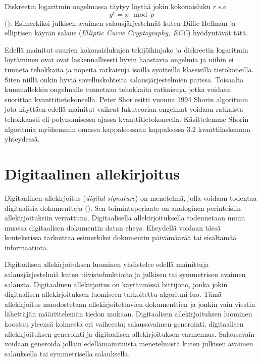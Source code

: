  Diskreetin logaritmin ongelmassa täytyy löytää jokin kokonaisluku 
 $r$ s.e 
 \[g^{r} = x \mod p\]
 (\cite{mavroeidis2018impact}). Esimerkiksi julkisen avaimen salausjärjestelmät kuten Diffie-Hellman ja elliptisen käyrän salaus (\emph{Elliptic Curve Cryptography, ECC}) hyödyntävät tätä.
 
 Edellä mainitut suurien kokonaislukujen tekijöihinjako ja diskreetin logaritmin löytäminen ovat ovat laskennallisesti hyvin haastavia ongelmia ja niihin ei tunneta tehokkaita ja nopeita ratkaisuja isoilla syötteillä klassisilla tietokoneilla. Siten niillä onkin hyviä sovelluskohteita salausjärjestelmien parissa. Toisaalta kummallekkin ongelmalle tunnetaan tehokkaita ratkaisuja, jotka voidaan suorittaa kvanttitietokoneella. Peter Shor esitti vuonna 1994 Shorin algoritmin jota käyttäen edellä mainitut vaikeat lukuteorian ongelmat voidaan ratkaista tehokkaasti eli polynomisessa ajassa kvanttitietokoneella. Käsittelemme Shorin algoritmia myöhemmin omassa kappaleessaan kappaleessa 3.2 kvanttilaskennan yhteydessä.
 
 \section{Digitaalinen allekirjoitus}
 Digitaalinen allekirjoitus (\emph{digital signature}) on menetelmä, jolla voidaan todentaa digitaalisia dokumentteja (\cite{1649003}). Sen toimintaperiaate on analoginen perinteisiin allekirjoituksiin verrattuna. Digitaalisella allekirjoituksella todennetaan muun muassa digitaalisen dokumentin datan eheys. Eheydellä voidaan tässä kontekstissa tarkoittaa esimerkiksi dokumentin päivämäärää tai sisältämää informaatiota.
 
 Digitaalisen allekirjoituksen luominen yhdistelee edellä mainittuja salausjärjestelmiä kuten tiivistefunktioita ja julkisen tai symmetrisen avaimen salausta. Digitaalinen allekirjoitus on käytännössä bittijono, jonka jokin digitaalisen allekirjoituksen luomiseen tarkoitettu algoritmi luo. Tämä allekirjoitus muodostetaan allekirjoitettavien dokumenttien ja jonkin vain viestin lähettäjän määrittelemän tiedon mukaan. Digitaalisen allekirjoituksen luominen koostuu yleensä kolmesta eri vaiheesta; salausavaimen generointi, digitaalisen allekirjoituksen generointi ja digitaalisen allekirjoituksen varmennus. Salausavain voidaan generoida jollain edellämainituista menetelmistä kuten julkisen avaimen salauksella tai symmetrisella salauksella.